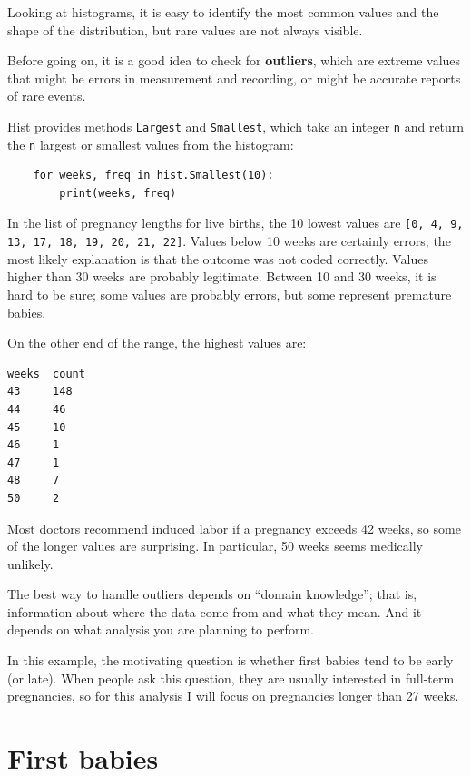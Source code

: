 \documentclass[12pt]{book}
\begin{document}
Looking at histograms, it is easy to identify the most common
values and the shape of the distribution, but rare values are
not always visible.

Before going on, it is a good idea to check for {\bf
  outliers}, which are extreme values that might be errors in
measurement and recording, or might be accurate reports of rare
events.

Hist provides methods \verb"Largest" and \verb"Smallest", which take
an integer \verb"n" and return the \verb"n" largest or smallest
values from the histogram:

\begin{verbatim}
    for weeks, freq in hist.Smallest(10):
        print(weeks, freq)
\end{verbatim}

In the list of pregnancy lengths for live births, the 10 lowest values
are \verb"[0, 4, 9, 13, 17, 18, 19, 20, 21, 22]".  Values below 10 weeks
are certainly errors; the most likely explanation is that the outcome
was not coded correctly.  Values higher than 30 weeks are probably
legitimate.  Between 10 and 30 weeks, it is hard to be sure; some
values are probably errors, but some represent premature babies.

On the other end of the range, the highest values are:
%
\begin{verbatim}
weeks  count
43     148
44     46
45     10
46     1
47     1
48     7
50     2
\end{verbatim}

Most doctors recommend induced labor if a pregnancy exceeds 42 weeks,
so some of the longer values are surprising.  In particular, 50 weeks
seems medically unlikely.

The best way to handle outliers depends on ``domain knowledge'';
that is, information about where the data come from and what they
mean.  And it depends on what analysis you are planning to perform.

In this example, the motivating question is whether first babies
tend to be early (or late).  When people ask this question, they are
usually interested in full-term pregnancies, so for this analysis
I will focus on pregnancies longer than 27 weeks.


\section{First babies}
\end{document}
